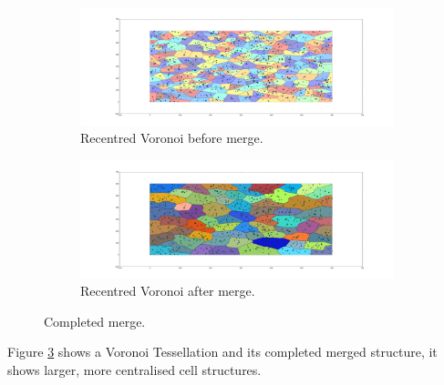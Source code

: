 \begin{figure}[H]
\begin{subfigure}[b]{0.5\textwidth}
  \includegraphics[width=\textwidth]{Images/merge1.png}
  \caption{Recentred Voronoi before merge.}
  \label{fig:merge1}
\end{subfigure}
\hfill
\begin{subfigure}[b]{0.5\textwidth}
  \includegraphics[width=\textwidth]{Images/merge2.png}
  \caption{Recentred Voronoi after merge.}
  \label{fig:merge2}
\end{subfigure}
\caption{Completed merge.}
\label{fig:merge}
\end{figure}
Figure \ref{fig:merge} shows a Voronoi Tessellation and its completed merged structure, it shows larger, more centralised cell structures.